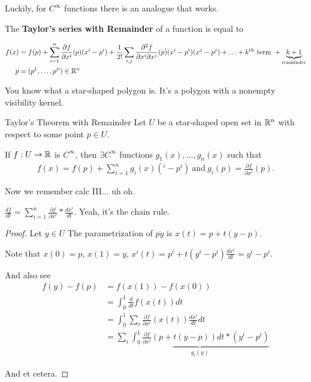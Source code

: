 \documentclass[12pt, twosided]{article}
\begin{document}
Luckily, for \(C^\infty\) functions there is an analogue that works.

The \textbf{Taylor's series with Remainder} of a function is equal to

\begin{align*}
  f(x) &= f(p) + \sum_{i = 1}^n \frac{\partial f}{\partial x^i}(p) (x^i - p^i) + \frac{1}{2!} \sum_{i, j} \frac{\partial^2 f}{\partial x^i \partial x^j}(p) (x^i - p^i)(x^j - p^j) + \ldots + k^\text{th} \text{ term } + \underbrace{k+1}_{\text{remainder}} \\
  p &= (p^1, \ldots, p^n) \in \mathbb{R}^n
\end{align*}

You know what a star-shaped polygon is. It's a polygon with a nonempty visibility kernel.

\begin{thm}{Taylor's Theorem with Remainder}
  Let \(U\) be a star-shaped open set in \(\mathbb{R}^n\) with respect to some point \(p \in U\).

  If \(f: U \to \mathbb{R} \) is \(C^\infty\), then \(\exists C^\infty\) functions \(g_1(x), \ldots, g_n(x)\) such that
  \begin{align*}
    f(x) = f(p) + \sum_{i = 1}^n g_i(x)(^i - p^i) \ \text{and}\ g_i(p) = \frac{\partial f}{\partial x^i}(p).
  \end{align*}
\end{thm}

Now we remember calc III... uh oh.

\begin{center}
\end{center}
\(\frac{d f}{dt} = \sum_{i = 1}^n \frac{\partial f}{\partial x^i} * \frac{d x^i}{d t}\).
Yeah, it's the chain rule.

\begin{proof}
  Let \(y \in U\) The parametrization of \(\overline{py}\) is \(x(t) = p + t(y - p)\).

  Note that \(x(0) = p\), \(x(1) = y\), \(x^i(t) = p^i + t(y^i - p^i) \frac{d x^i}{d t} = y^i - p ^i\).

  And also see
  \begin{align*}
    f(y) - f(p) &= f(x(1)) - f(x(0)) \\
                &= \int_0^1 \frac{d}{dt}f(x(t)) dt \\
                &= \int_0^1 \sum_i \frac{\partial f}{\partial x^i}(x(t)) \frac{dx^i}{dt} dt \\
                &= \sum_i \underbrace{\int_0^1 \frac{\partial f}{\partial x^i} (p + t(y - p)) dt * (y^i - p^i)}_{g_i(y)}
  \end{align*}

  And et cetera.
\end{proof}
\end{document}
